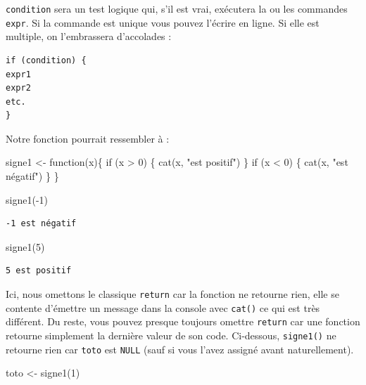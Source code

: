 \documentclass[
  letterpaper,
  DIV=11,
  numbers=noendperiod]{scrreprt}
\newenvironment{Shaded}{\begin{snugshade}}{\end{snugshade}}
\newcommand{\ControlFlowTok}[1]{\textcolor[rgb]{0.00,0.23,0.31}{#1}}
\newcommand{\DecValTok}[1]{\textcolor[rgb]{0.68,0.00,0.00}{#1}}
\newcommand{\FunctionTok}[1]{\textcolor[rgb]{0.28,0.35,0.67}{#1}}
\newcommand{\NormalTok}[1]{\textcolor[rgb]{0.00,0.23,0.31}{#1}}
\newcommand{\OtherTok}[1]{\textcolor[rgb]{0.00,0.23,0.31}{#1}}
\newcommand{\SpecialCharTok}[1]{\textcolor[rgb]{0.37,0.37,0.37}{#1}}
\newcommand{\StringTok}[1]{\textcolor[rgb]{0.13,0.47,0.30}{#1}}
\begin{document}
\texttt{condition} sera un test logique qui, s'il est vrai, exécutera la
ou les commandes \texttt{expr}. Si la commande est unique vous pouvez
l'écrire en ligne. Si elle est multiple, on l'embrassera d'accolades :

\begin{verbatim}
if (condition) {
expr1
expr2
etc.
}
\end{verbatim}

Notre fonction pourrait ressembler à :

\begin{Shaded}
\begin{Highlighting}[]
\NormalTok{signe1 }\OtherTok{\textless{}{-}} \ControlFlowTok{function}\NormalTok{(x)\{}
  \ControlFlowTok{if}\NormalTok{ (x }\SpecialCharTok{\textgreater{}} \DecValTok{0}\NormalTok{) \{}
    \FunctionTok{cat}\NormalTok{(x, }\StringTok{"est positif"}\NormalTok{)}
\NormalTok{  \}}
  \ControlFlowTok{if}\NormalTok{ (x }\SpecialCharTok{\textless{}} \DecValTok{0}\NormalTok{) \{}
    \FunctionTok{cat}\NormalTok{(x, }\StringTok{"est négatif"}\NormalTok{)}
\NormalTok{  \}}
\NormalTok{\}}

\FunctionTok{signe1}\NormalTok{(}\SpecialCharTok{{-}}\DecValTok{1}\NormalTok{)}
\end{Highlighting}
\end{Shaded}

\begin{verbatim}
-1 est négatif
\end{verbatim}

\begin{Shaded}
\begin{Highlighting}[]
\FunctionTok{signe1}\NormalTok{(}\DecValTok{5}\NormalTok{)}
\end{Highlighting}
\end{Shaded}

\begin{verbatim}
5 est positif
\end{verbatim}

Ici, nous omettons le classique \texttt{return} car la fonction ne
retourne rien, elle se contente d'émettre un message dans la console
avec \texttt{cat()} ce qui est très différent. Du reste, vous pouvez
presque toujours omettre \texttt{return} car une fonction retourne
simplement la dernière valeur de son code. Ci-dessous, \texttt{signe1()}
ne retourne rien car \texttt{toto} est \texttt{NULL} (sauf si vous
l'avez assigné avant naturellement).

\begin{Shaded}
\begin{Highlighting}[]
\NormalTok{toto }\OtherTok{\textless{}{-}} \FunctionTok{signe1}\NormalTok{(}\DecValTok{1}\NormalTok{)}
\end{Highlighting}
\end{Shaded}
\end{document}
